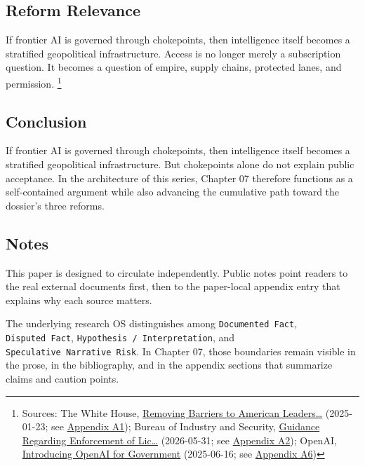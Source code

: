 \documentclass[
  american,
  11pt,
  letterpaper,
]{article}
\begin{document}
\subsection{Reform Relevance}\label{reform-relevance}

If frontier AI is governed through chokepoints, then intelligence itself
becomes a stratified geopolitical infrastructure. Access is no longer
merely a subscription question. It becomes a question of empire, supply
chains, protected lanes, and permission. \footnote{Sources: The White
  House,
  \href{https://www.whitehouse.gov/presidential-actions/2025/01/removing-barriers-to-american-leadership-in-artificial-intelligence/}{Removing
  Barriers to American Leaders\ldots{}} (2025-01-23; see
  \hyperref[appendix-a1-removing-barriers-to-american-leadership-in-artificial-intelligence]{Appendix
  A1}); Bureau of Industry and Security,
  \href{https://www.bis.gov/media/documents/bis-guidance-may-31-2026.pdf}{Guidance
  Regarding Enforcement of Lic\ldots{}} (2026-05-31; see
  \hyperref[appendix-a2-guidance-regarding-enforcement-of-license-requirements-for-advanced-computing-items-for-entities-headquartered-in-country-group-d-5-and-macau]{Appendix
  A2}); OpenAI,
  \href{https://openai.com/global-affairs/introducing-openai-for-government/}{Introducing
  OpenAI for Government} (2025-06-16; see
  \hyperref[appendix-a6-introducing-openai-for-government]{Appendix A6})}

\subsection{Conclusion}\label{conclusion}

If frontier AI is governed through chokepoints, then intelligence itself
becomes a stratified geopolitical infrastructure. But chokepoints alone
do not explain public acceptance. In the architecture of this series,
Chapter 07 therefore functions as a self-contained argument while also
advancing the cumulative path toward the dossier's three reforms.

\subsection{Notes}\label{notes}

This paper is designed to circulate independently. Public notes point
readers to the real external documents first, then to the paper-local
appendix entry that explains why each source matters.

The underlying research OS distinguishes among
\texttt{Documented\ Fact}, \texttt{Disputed\ Fact},
\texttt{Hypothesis\ /\ Interpretation}, and
\texttt{Speculative\ Narrative\ Risk}. In Chapter 07, those boundaries
remain visible in the prose, in the bibliography, and in the appendix
sections that summarize claims and caution points.
\end{document}
